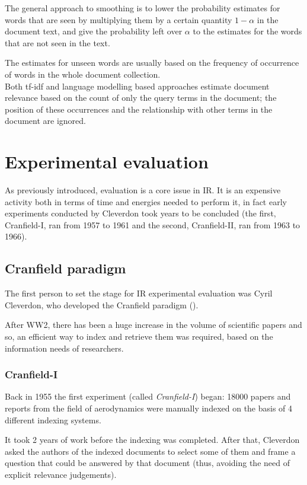 The general approach to smoothing is to lower the probability estimates for words that are seen by multiplying them by a certain quantity $1- \alpha$ in the document text, and give the probability left over $\alpha$ to the estimates for the words that are not seen in the text.

The estimates for unseen words are usually based on the frequency of occurrence of words in the whole document collection. \\

Both tf-idf and language modelling based approaches estimate document relevance based on the count of only the query terms in the document; the position of these occurrences and the relationship with other terms in the document are ignored.

\section{Experimental evaluation}

As previously introduced, evaluation is a core issue in IR. It is an expensive activity both in terms of time and energies needed to perform it, in fact early experiments conducted by Cleverdon took years to be concluded (the first, Cranfield-I, ran from 1957 to 1961 and the second, Cranfield-II, ran from 1963 to 1966).

\subsection{Cranfield paradigm}

The first person to set the stage for IR experimental evaluation was Cyril Cleverdon, who developed the Cranfield paradigm (\cite{harmaneval}).

After WW2, there has been a huge increase in the volume of scientific papers and so, an efficient way to index and retrieve them was required, based on the information needs of researchers.

\subsubsection{Cranfield-I}

Back in 1955 the first experiment (called \textit{Cranfield-I}) began: 18000 papers and reports from the field of aerodynamics were manually indexed on the basis of 4 different indexing systems.

It took 2 years of work before the indexing was completed. After that, Cleverdon asked the authors of the indexed documents to select some of them and frame a question that could be answered by that document (thus, avoiding the need of explicit relevance judgements).

